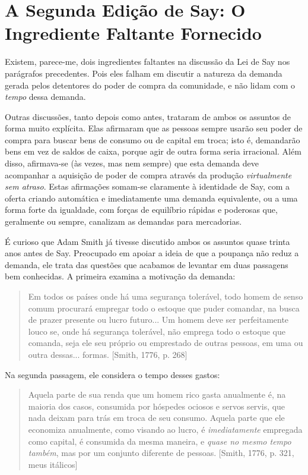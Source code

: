 \documentclass[12pt]{article}
\begin{document}
\section{A Segunda Edição de Say: O Ingrediente Faltante Fornecido}

Existem, parece-me, dois ingredientes faltantes na discussão da Lei de Say nos parágrafos precedentes. Pois eles falham em discutir a natureza da demanda gerada pelos detentores do poder de compra da comunidade, e não lidam com o \textit{tempo} dessa demanda.

Outras discussões, tanto depois como antes, trataram de ambos os assuntos de forma muito explícita. Elas afirmaram que as pessoas sempre usarão seu poder de compra para buscar bens de consumo ou de capital em troca; isto é, demandarão bens em vez de saldos de caixa, porque agir de outra forma seria irracional. Além disso, afirmava-se (às vezes, mas nem sempre) que esta demanda deve acompanhar a aquisição de poder de compra através da produção \textit{virtualmente sem atraso}. Estas afirmações somam-se claramente à identidade de Say, com a oferta criando automática e imediatamente uma demanda equivalente, ou a uma forma forte da igualdade, com forças de equilíbrio rápidas e poderosas que, geralmente ou sempre, canalizam as demandas para mercadorias.

É curioso que Adam Smith já tivesse discutido ambos os assuntos quase trinta anos antes de Say. Preocupado em apoiar a ideia de que a poupança não reduz a demanda, ele trata das questões que acabamos de levantar em duas passagens bem conhecidas. A primeira examina a motivação da demanda:

\begin{quote}
Em todos os países onde há uma segurança tolerável, todo homem de senso comum procurará empregar todo o estoque que puder comandar, na busca de prazer presente ou lucro futuro... Um homem deve ser perfeitamente louco se, onde há segurança tolerável, não emprega todo o estoque que comanda, seja ele seu próprio ou emprestado de outras pessoas, em uma ou outra dessas... formas. [Smith, 1776, p. 268]
\end{quote}

Na segunda passagem, ele considera o tempo desses gastos:

\begin{quote}
Aquela parte de sua renda que um homem rico gasta anualmente é, na maioria dos casos, consumida por hóspedes ociosos e servos servis, que nada deixam para trás em troca de seu consumo. Aquela parte que ele economiza anualmente, como visando ao lucro, é \textit{imediatamente} empregada como capital, é consumida da mesma maneira, e \textit{quase no mesmo tempo também}, mas por um conjunto diferente de pessoas. [Smith, 1776, p. 321, meus itálicos]
\end{quote}
\end{document}
